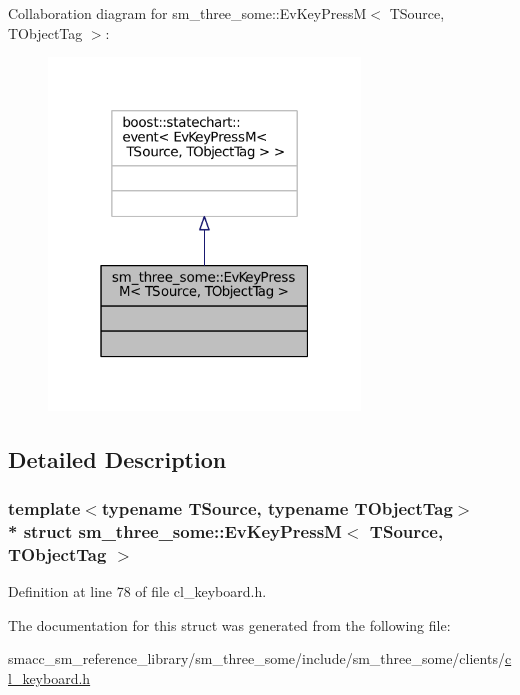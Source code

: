 Collaboration diagram for sm\+\_\+three\+\_\+some\+:\+:Ev\+Key\+PressM$<$ T\+Source, T\+Object\+Tag $>$\+:
\nopagebreak
\begin{figure}[H]
\begin{center}
\leavevmode
\includegraphics[width=235pt]{structsm__three__some_1_1EvKeyPressM__coll__graph}
\end{center}
\end{figure}


\subsection{Detailed Description}
\subsubsection*{template$<$typename T\+Source, typename T\+Object\+Tag$>$\\*
struct sm\+\_\+three\+\_\+some\+::\+Ev\+Key\+Press\+M$<$ T\+Source, T\+Object\+Tag $>$}



Definition at line 78 of file cl\+\_\+keyboard.\+h.



The documentation for this struct was generated from the following file\+:\begin{DoxyCompactItemize}
\item 
smacc\+\_\+sm\+\_\+reference\+\_\+library/sm\+\_\+three\+\_\+some/include/sm\+\_\+three\+\_\+some/clients/\hyperlink{cl__keyboard_8h}{cl\+\_\+keyboard.\+h}\end{DoxyCompactItemize}
